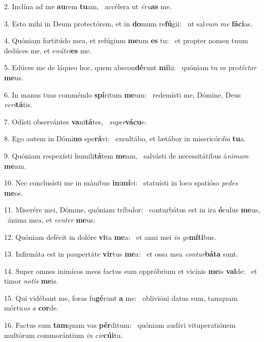 2. Inclína ad me \textbf{au}rem \textbf{tu}am, \ast\  accélera ut \textit{é}\textit{ru}\textbf{as} me.\

3. Esto mihi in Deum protectórem, et in \textbf{do}mum re\textbf{fú}gii: \ast\  ut sal\textit{vum} \textit{me} \textbf{fá}\textbf{ci}as.\

4. Quóniam fortitúdo mea, et refúgium \textbf{me}um \textbf{es} tu: \ast\  et propter nomen tuum dedúces me, et e\textit{nú}\textit{tri}\textbf{es} me.\

5. Edúces me de láqueo hoc, quem abscon\textbf{dé}runt \textbf{mi}hi: \ast\  quóniam tu es pro\textit{téc}\textit{tor} \textbf{me}us.\

6. In manus tuas comméndo \textbf{spí}ritum \textbf{me}um: \ast\  redemísti me, Dómine, Deus \textit{ve}\textit{ri}\textbf{tá}tis.\

7. Odísti observántes \textbf{va}ni\textbf{tá}tes, \ast\  \textit{su}\textit{per}\textbf{vá}\textbf{cu}e.\

8. Ego autem in Dómi\textbf{no} spe\textbf{rá}vi: \ast\  exsultábo, et lætábor in misericór\textit{di}\textit{a} \textbf{tu}a.\

9. Quóniam respexísti humili\textbf{tá}tem \textbf{me}am, \ast\  salvásti de necessitátibus á\textit{ni}\textit{mam} \textbf{me}am.\

10. Nec conclusísti me in mánibus \textbf{in}i\textbf{mí}ci: \ast\  statuísti in loco spatióso \textit{pe}\textit{des} \textbf{me}os.\

11. Miserére mei, Dómine, quóniam tríbulor: \dag\  conturbátus est in ira \textbf{ó}culus \textbf{me}us, \ast\  ánima mea, et \textit{ven}\textit{ter} \textbf{me}us:\

12. Quóniam defécit in dolóre \textbf{vi}ta \textbf{me}a: \ast\  et anni mei \textit{in} \textit{ge}\textbf{mí}\textbf{ti}bus.\

13. Infirmáta est in paupertáte \textbf{vir}tus \textbf{me}a: \ast\  et ossa mea \textit{con}\textit{tur}\textbf{bá}\textbf{ta} sunt.\

14. Super omnes inimícos meos factus sum oppróbrium et vicínis \textbf{me}is \textbf{val}de: \ast\  et timor \textit{no}\textit{tis} \textbf{me}is.\

15. Qui vidébant me, foras fu\textbf{gé}runt \textbf{a} me: \ast\  oblivióni datus sum, tamquam mórtu\textit{us} \textit{a} \textbf{cor}de.\

16. Factus sum \textbf{tam}quam vas \textbf{pér}ditum: \ast\  quóniam audívi vituperatiónem multórum commorántium \textit{in} \textit{cir}\textbf{cú}\textbf{i}tu.\

